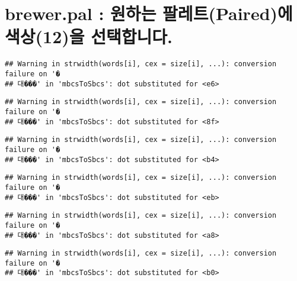 \documentclass[]{article}
\newenvironment{Shaded}{\begin{snugshade}}{\end{snugshade}}
\newcommand{\KeywordTok}[1]{\textcolor[rgb]{0.13,0.29,0.53}{\textbf{#1}}}
\newcommand{\DataTypeTok}[1]{\textcolor[rgb]{0.13,0.29,0.53}{#1}}
\newcommand{\DecValTok}[1]{\textcolor[rgb]{0.00,0.00,0.81}{#1}}
\newcommand{\OperatorTok}[1]{\textcolor[rgb]{0.81,0.36,0.00}{\textbf{#1}}}
\newcommand{\NormalTok}[1]{#1}
\begin{document}
\section{brewer.pal : 원하는 팔레트(Paired)에 색상(12)을
선택합니다.}\label{brewer.pal--paired-12-.}

\begin{Shaded}
\end{Shaded}

\begin{verbatim}
## Warning in strwidth(words[i], cex = size[i], ...): conversion failure on '�
## 대���' in 'mbcsToSbcs': dot substituted for <e6>
\end{verbatim}

\begin{verbatim}
## Warning in strwidth(words[i], cex = size[i], ...): conversion failure on '�
## 대���' in 'mbcsToSbcs': dot substituted for <8f>
\end{verbatim}

\begin{verbatim}
## Warning in strwidth(words[i], cex = size[i], ...): conversion failure on '�
## 대���' in 'mbcsToSbcs': dot substituted for <b4>
\end{verbatim}

\begin{verbatim}
## Warning in strwidth(words[i], cex = size[i], ...): conversion failure on '�
## 대���' in 'mbcsToSbcs': dot substituted for <eb>
\end{verbatim}

\begin{verbatim}
## Warning in strwidth(words[i], cex = size[i], ...): conversion failure on '�
## 대���' in 'mbcsToSbcs': dot substituted for <a8>
\end{verbatim}

\begin{verbatim}
## Warning in strwidth(words[i], cex = size[i], ...): conversion failure on '�
## 대���' in 'mbcsToSbcs': dot substituted for <b0>
\end{verbatim}
\end{document}
